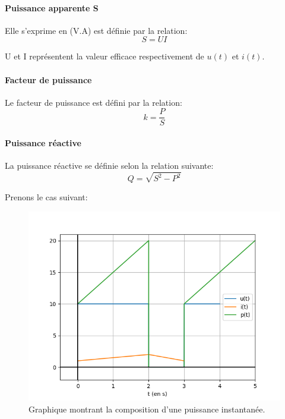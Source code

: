 \documentclass[12pt,a4paper,openany]{book}
\begin{document}
\paragraph{Puissance apparente S} Elle s'exprime en (V.A) est définie par la relation:
\begin{equation}
S = UI
\end{equation}

U et I représentent la valeur efficace respectivement de $ u(t) $ et $ i(t) $.

\paragraph{Facteur de puissance} Le facteur de puissance est défini par la relation:
\begin{equation}
k = \frac{P}{S}
\end{equation}

\paragraph{Puissance réactive} La puissance réactive se définie selon la relation suivante:
\begin{equation}
Q = \sqrt{S^{2} - P^{2}}
\end{equation}

Prenons le cas suivant:
\begin{figure}[!h]
\begin{center}
\includegraphics[scale=0.8]{Images/calculPuissance.png} 
\caption{Graphique montrant la composition d'une puissance instantanée.}
\label{calculPuissance}
\end{center}
\end{figure}
\end{document}
